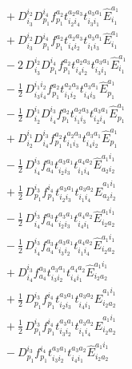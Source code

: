 \documentclass[11pt]{article}
\begin{document}
\begin{align}
&\quad + D^{i_{2}}_{i_{3}} D^{i_{4}}_{p_{1}} f^{a_{2}}_{p_{1}} t^{a_{2}a_{3}}_{i_{2}i_{4}} t^{a_{3}a_{1}}_{i_{3}i_{1}} \hat{E}^{a_{1}}_{i_{1}} \\
&\quad + D^{i_{2}}_{i_{3}} D^{i_{4}}_{p_{1}} f^{a_{2}}_{p_{1}} t^{a_{2}a_{3}}_{i_{4}i_{2}} t^{a_{3}a_{1}}_{i_{1}i_{3}} \hat{E}^{a_{1}}_{i_{1}} \\
&\quad - 2\, D^{i_{2}}_{i_{3}} D^{i_{4}}_{p_{1}} f^{a_{2}}_{p_{1}} t^{a_{2}a_{3}}_{i_{4}i_{2}} t^{a_{3}a_{1}}_{i_{3}i_{1}} \hat{E}^{a_{1}}_{i_{1}} \\
&\quad - \tfrac{1}{2}\, D^{i_{1}i_{2}}_{i_{3}i_{4}} f^{a_{2}}_{p_{1}} t^{a_{2}a_{3}}_{i_{1}i_{2}} t^{a_{3}a_{1}}_{i_{4}i_{3}} \hat{E}^{a_{1}}_{p_{1}} \\
&\quad - \tfrac{1}{2}\, D^{i_{1}}_{i_{2}} D^{i_{3}}_{i_{4}} f^{a_{2}}_{p_{1}} t^{a_{2}a_{3}}_{i_{1}i_{3}} t^{a_{3}a_{1}}_{i_{2}i_{4}} \hat{E}^{a_{1}}_{p_{1}} \\
&\quad + D^{i_{1}}_{i_{2}} D^{i_{3}}_{i_{4}} f^{a_{2}}_{p_{1}} t^{a_{2}a_{3}}_{i_{1}i_{3}} t^{a_{3}a_{1}}_{i_{4}i_{2}} \hat{E}^{a_{1}}_{p_{1}} \\
&\quad - \tfrac{1}{2}\, D^{i_{3}}_{i_{4}} f^{a_{3}}_{a_{4}} t^{a_{3}a_{1}}_{i_{2}i_{3}} t^{a_{4}a_{2}}_{i_{1}i_{4}} \hat{E}^{a_{1}i_{1}}_{a_{2}i_{2}} \\
&\quad + \tfrac{1}{2}\, D^{i_{3}}_{p_{1}} f^{i_{4}}_{p_{1}} t^{a_{3}a_{1}}_{i_{2}i_{3}} t^{a_{3}a_{2}}_{i_{1}i_{4}} \hat{E}^{a_{1}i_{1}}_{a_{2}i_{2}} \\
&\quad - \tfrac{1}{2}\, D^{i_{3}}_{i_{4}} f^{a_{3}}_{a_{4}} t^{a_{3}a_{1}}_{i_{2}i_{3}} t^{a_{4}a_{2}}_{i_{4}i_{1}} \hat{E}^{a_{1}i_{1}}_{i_{2}a_{2}} \\
&\quad - \tfrac{1}{2}\, D^{i_{3}}_{i_{4}} f^{a_{3}}_{a_{4}} t^{a_{3}a_{1}}_{i_{3}i_{2}} t^{a_{4}a_{2}}_{i_{1}i_{4}} \hat{E}^{a_{1}i_{1}}_{i_{2}a_{2}} \\
&\quad + D^{i_{3}}_{i_{4}} f^{a_{3}}_{a_{4}} t^{a_{3}a_{1}}_{i_{3}i_{2}} t^{a_{4}a_{2}}_{i_{4}i_{1}} \hat{E}^{a_{1}i_{1}}_{i_{2}a_{2}} \\
&\quad + \tfrac{1}{2}\, D^{i_{3}}_{p_{1}} f^{i_{4}}_{p_{1}} t^{a_{3}a_{1}}_{i_{2}i_{3}} t^{a_{3}a_{2}}_{i_{4}i_{1}} \hat{E}^{a_{1}i_{1}}_{i_{2}a_{2}} \\
&\quad + \tfrac{1}{2}\, D^{i_{3}}_{p_{1}} f^{i_{4}}_{p_{1}} t^{a_{3}a_{1}}_{i_{3}i_{2}} t^{a_{3}a_{2}}_{i_{1}i_{4}} \hat{E}^{a_{1}i_{1}}_{i_{2}a_{2}} \\
&\quad - D^{i_{3}}_{p_{1}} f^{i_{4}}_{p_{1}} t^{a_{3}a_{1}}_{i_{3}i_{2}} t^{a_{3}a_{2}}_{i_{4}i_{1}} \hat{E}^{a_{1}i_{1}}_{i_{2}a_{2}} \\

\end{align}
\end{document}
